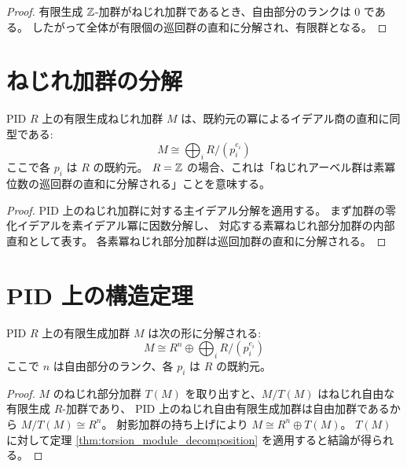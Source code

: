 \begin{proof}
有限生成 $\mathbb{Z}$-加群がねじれ加群であるとき、自由部分のランクは $0$ である。
したがって全体が有限個の巡回群の直和に分解され、有限群となる。
\end{proof}

\section{ねじれ加群の分解}

\begin{theorem}[ねじれ加群の素冪分解]
\label{thm:torsion_module_decomposition}
PID $R$ 上の有限生成ねじれ加群 $M$ は、既約元の冪によるイデアル商の直和に同型である:
\[
  M \cong \bigoplus_{i} R / (p_i^{e_i})
\]
ここで各 $p_i$ は $R$ の既約元。
$R = \mathbb{Z}$ の場合、これは「ねじれアーベル群は素冪位数の巡回群の直和に分解される」ことを意味する。
\end{theorem}

\begin{proof}
PID 上のねじれ加群に対する主イデアル分解を適用する。
まず加群の零化イデアルを素イデアル冪に因数分解し、
対応する素冪ねじれ部分加群の内部直和として表す。
各素冪ねじれ部分加群は巡回加群の直和に分解される。
\end{proof}

\section{PID 上の構造定理}

\begin{theorem}
\label{thm:structure_theorem_pid}
PID $R$ 上の有限生成加群 $M$ は次の形に分解される:
\[
  M \cong R^n \oplus \bigoplus_{i} R / (p_i^{e_i})
\]
ここで $n$ は自由部分のランク、各 $p_i$ は $R$ の既約元。
\end{theorem}

\begin{proof}
$M$ のねじれ部分加群 $T(M)$ を取り出すと、$M / T(M)$ はねじれ自由な有限生成 $R$-加群であり、
PID 上のねじれ自由有限生成加群は自由加群であるから $M / T(M) \cong R^n$。
射影加群の持ち上げにより $M \cong R^n \oplus T(M)$。
$T(M)$ に対して定理 \ref{thm:torsion_module_decomposition} を適用すると結論が得られる。
\end{proof}

